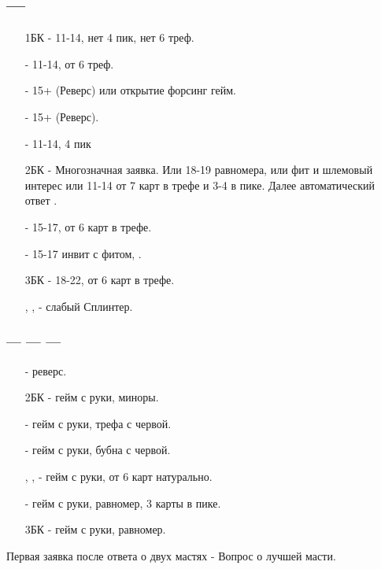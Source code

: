 \documentclass{article}
\begin{document}
\subsection{ --- }
\begin{enumerate}
    \item[1БК] - 11-14, нет 4 пик, нет 6 треф.
    \item[\cl{2}] - 11-14, от 6 треф.
    \item[\di{2}] - 15+  (Реверс) или открытие форсинг гейм.
    \item[\he{2}] - 15+  (Реверс).
    \item[\sp{2}] - 11-14, 4 пик
    \item[2БК] - Многозначная заявка. Или 18-19 равномера, или фит и шлемовый интерес или 11-14 от 7 карт в трефе и 3-4 в пике. Далее автоматический ответ .
    \item[\cl{3}] - 15-17, от 6 карт в трефе.
    \item[\sp{3}] - 15-17 инвит с фитом, .
    \item[3БК] - 18-22, от 6 карт в трефе.
    \item[\cl{4}, \di{4}, \he{4}] - слабый Сплинтер.
\end{enumerate}
\subsubsection{ ---  ---  --- }
\begin{enumerate}
    \item[\sp{2}] - реверс.
    \item[2БК] - гейм с руки, миноры.
    \item[\cl{3}] - гейм с руки, трефа с червой.
    \item[\di{3}] - гейм с руки, бубна с червой.
    \item[\he{3}, \cl{4}, \di{4}] - гейм с руки, от 6 карт натурально.
    \item[\sp{3}] - гейм с руки, равномер, 3 карты в пике.
    \item[3БК] - гейм с руки, равномер.
\end{enumerate}
Первая заявка после ответа о двух мастях - Вопрос о лучшей масти. 
\end{document}
